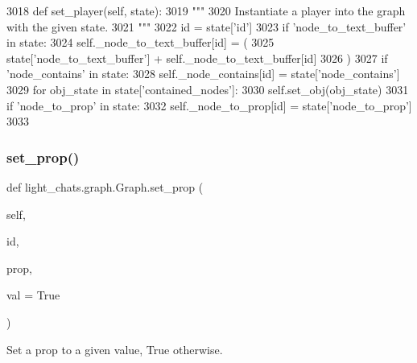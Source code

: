 \begin{DoxyCode}
3018     \textcolor{keyword}{def }set\_player(self, state):
3019         \textcolor{stringliteral}{"""}
3020 \textcolor{stringliteral}{        Instantiate a player into the graph with the given state.}
3021 \textcolor{stringliteral}{        """}
3022         id = state[\textcolor{stringliteral}{'id'}]
3023         \textcolor{keywordflow}{if} \textcolor{stringliteral}{'node\_to\_text\_buffer'} \textcolor{keywordflow}{in} state:
3024             self.\_node\_to\_text\_buffer[id] = (
3025                 state[\textcolor{stringliteral}{'node\_to\_text\_buffer'}] + self.\_node\_to\_text\_buffer[id]
3026             )
3027         \textcolor{keywordflow}{if} \textcolor{stringliteral}{'node\_contains'} \textcolor{keywordflow}{in} state:
3028             self.\_node\_contains[id] = state[\textcolor{stringliteral}{'node\_contains'}]
3029             \textcolor{keywordflow}{for} obj\_state \textcolor{keywordflow}{in} state[\textcolor{stringliteral}{'contained\_nodes'}]:
3030                 self.set\_obj(obj\_state)
3031         \textcolor{keywordflow}{if} \textcolor{stringliteral}{'node\_to\_prop'} \textcolor{keywordflow}{in} state:
3032             self.\_node\_to\_prop[id] = state[\textcolor{stringliteral}{'node\_to\_prop'}]
3033 
\end{DoxyCode}
\mbox{\label{classlight__chats_1_1graph_1_1Graph_ae2c69adb1ea1477aaa6d9af693b30fa1}} 
\subsubsection{\texorpdfstring{set\+\_\+prop()}{set\_prop()}}
{\footnotesize\ttfamily def light\+\_\+chats.\+graph.\+Graph.\+set\+\_\+prop (\begin{DoxyParamCaption}\item[{}]{self,  }\item[{}]{id,  }\item[{}]{prop,  }\item[{}]{val = {\ttfamily True} }\end{DoxyParamCaption})}

\begin{DoxyVerb}Set a prop to a given value, True otherwise.
\end{DoxyVerb}
 

